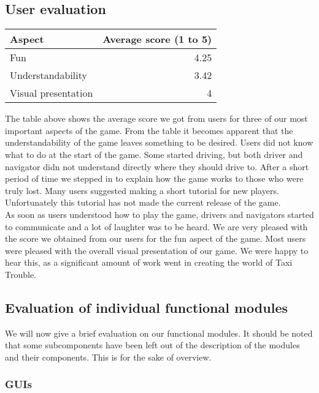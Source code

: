 \subsection{User evaluation}{
\begin{center}
\begin{tabular}{| l | r |}
	\hline
	Aspect & Average score (1 to 5) \\ \hline
	Fun & 4.25 \\ \hline
	Understandability  & 3.42 \\ \hline
	Visual presentation & 4\\ \hline
\end{tabular}
\end{center} 

The table above shows the average score we got from users for three of our most important aspects of the game. From the table it becomes apparent that the understandability  of the game leaves something to be desired. Users did not know what to do at the start of the game. Some started driving, but both driver and navigator didn not understand directly where they should drive to. After a short period of time we stepped in to explain how the game works to those who were truly lost. Many users suggested making a short tutorial for new players. Unfortunately this tutorial has not made the current release of the game.\\

As soon as users understood how to play the game, drivers and navigators started to communicate and a lot of laughter was to be heard. We are very pleased with the score we obtained from our users for the fun aspect of the game. Most users were pleased with the overall visual presentation of our game. We were happy to hear this, as a significant amount of work went in creating the world of Taxi Trouble.

\subsection{Evaluation of individual functional modules}

We will now give a brief evaluation on our functional modules. It should be noted that some subcomponents have been left out of the description of the modules and their components. This is for the sake of overview.

\subsubsection{GUIs}

}
